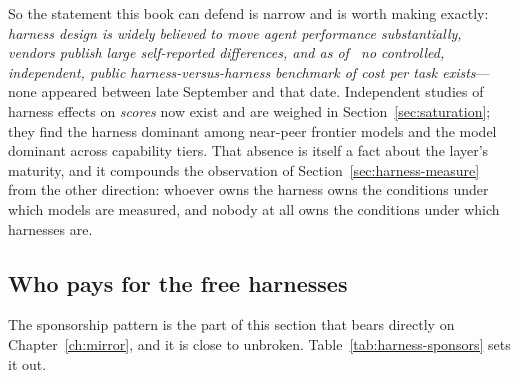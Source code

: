 So the statement this book can defend is narrow and is worth making exactly: \emph{harness design is widely believed to move agent performance substantially, vendors publish large self-reported differences, and as of \datafreeze\ no controlled, independent, public harness-versus-harness benchmark of \emph{cost per task} exists}---none appeared between late September and that date. Independent studies of harness effects on \emph{scores} now exist and are weighed in Section~\ref{sec:saturation}; they find the harness dominant among near-peer frontier models and the model dominant across capability tiers. That absence is itself a fact about the layer's maturity, and it compounds the observation of Section~\ref{sec:harness-measure} from the other direction: whoever owns the harness owns the conditions under which models are measured, and nobody at all owns the conditions under which harnesses are.

\subsection{Who pays for the free harnesses}

The sponsorship pattern is the part of this section that bears directly on Chapter~\ref{ch:mirror}, and it is close to unbroken. Table~\ref{tab:harness-sponsors} sets it out.

